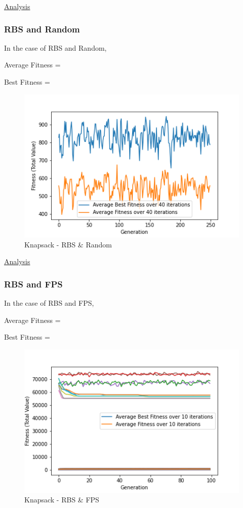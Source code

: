 \documentclass[11pt, letterpaper]{article}
\begin{document}
\underline{Analysis}
\subsubsection {RBS and Random}
In the case of RBS and Random,

Average Fitness = 

Best Fitness = 
\begin{figure}[H]
    \centering
    \includegraphics[scale = 0.6]{images/knapsack_rd_rd.png}
    \caption {Knapsack - RBS \& Random}
    \label {fig:kpRbR}
\end{figure}

\underline{Analysis}
\subsubsection {RBS and FPS}
In the case of RBS and FPS,

Average Fitness = 

Best Fitness = 
\begin{figure}[H]
    \centering
    \includegraphics[scale = 0.6]{images/knapsack_rb_fp.png}
    \caption {Knapsack - RBS \& FPS}
    \label {fig:kpBF}
\end{figure}
\end{document}
